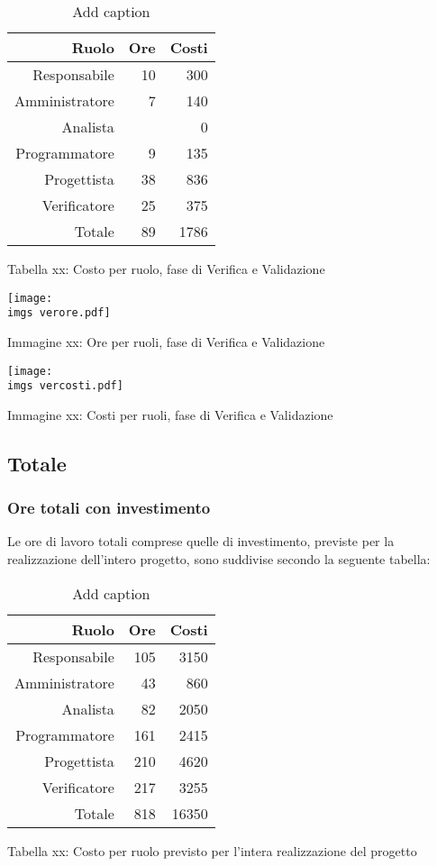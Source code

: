 \begin{table}[htbp]
  \centering
  \caption{Add caption}
    \begin{tabular}{rrr}
    \toprule
    Ruolo & Ore   & Costi \\
    \midrule
    Responsabile & 10    & 300 \\
    Amministratore & 7     & 140 \\
    Analista &       & 0 \\
    Programmatore & 9     & 135 \\
    Progettista & 38    & 836 \\
    Verificatore & 25    & 375 \\
    Totale & 89    & 1786 \\
    \bottomrule
    \end{tabular}%
  \label{tab:addlabel}%
\end{table}%
\caption{Tabella xx: Costo per ruolo, fase di Verifica e Validazione}

\texttt{[image: \\imgs verore.pdf]}
\caption{Immagine xx: Ore per ruoli, fase di Verifica e Validazione}

\texttt{[image: \\imgs vercosti.pdf]}
\caption{Immagine xx: Costi per ruoli, fase di Verifica e Validazione}

\subsection{Totale}
\subsubsection{Ore totali con investimento}
Le ore di lavoro totali comprese quelle di investimento, previste per la realizzazione dell’intero progetto, sono suddivise secondo la seguente tabella:

\begin{table}[htbp]
  \centering
  \caption{Add caption}
    \begin{tabular}{rrr}
    \toprule
    Ruolo & Ore   & Costi \\
    \midrule
    Responsabile & 105   & 3150 \\
    Amministratore & 43    & 860 \\
    Analista & 82    & 2050 \\
    Programmatore & 161   & 2415 \\
    Progettista & 210   & 4620 \\
    Verificatore & 217   & 3255 \\
    Totale & 818   & 16350 \\
    \bottomrule
    \end{tabular}%
  \label{tab:addlabel}%
\end{table}%
\caption{Tabella xx: Costo per ruolo previsto per l’intera realizzazione del progetto}

